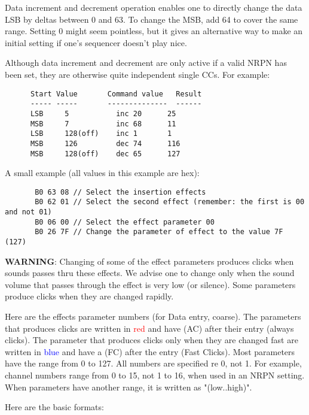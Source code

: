    Data increment and decrement operation enables one to directly change the
   data LSB by deltas between 0 and 63.
   To change the MSB, add 64 to cover the same
   range. Setting 0 might seem pointless, but it gives an alternative way
   to make an initial setting if one's sequencer doesn't play nice.

   Although data increment and decrement are only active if a valid NRPN has
   been set, they are otherwise quite independent single CCs.  For example:

   \begin{verbatim}
      Start Value       Command value   Result
      ----- -----       --------------  ------
      LSB     5           inc 20      25
      MSB     7           inc 68      11
      LSB     128(off)    inc 1       1
      MSB     126         dec 74      116
      MSB     128(off)    dec 65      127
   \end{verbatim}

   A small example (all values in this example are hex):

   \begin{verbatim}
       B0 63 08 // Select the insertion effects
       B0 62 01 // Select the second effect (remember: the first is 00 and not 01)
       B0 06 00 // Select the effect parameter 00
       B0 26 7F // Change the parameter of effect to the value 7F (127)
   \end{verbatim}

   \textbf{WARNING}:
   Changing of some of the effect parameters produces clicks when sounds
   passes thru these effects.  We advise one to change only when the sound
   volume that passes through the effect is very low (or silence).  Some
   parameters produce clicks when they are changed rapidly.

   Here are the effects parameter numbers (for Data entry, coarse).
   The parameters that produces clicks are written in \textcolor{red}{red}
   and have (AC) after their entry (always clicks).
   The parameter that produces clicks only when they are changed fast are
   written in \textcolor{blue}{blue} and have a (FC) after the entry (Fast
   Clicks).
   Most parameters have the range from 0 to 127.  All numbers are specified re 0,
   not 1.  For example, channel numbers range from 0 to 15, not 1 to 16, when
   used in an NRPN setting.
   When parameters have another range, it is written as "(low..high)".

   Here are the basic formats:

